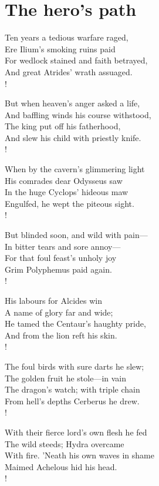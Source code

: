\documentclass[12pt]{book}
\newenvironment{vpoem}[1]%
  {\def\poemvsindentlines{#1}\begin{poem}\small}%
  {\end{poem}\def\poemvsindentlines{\relax}}
\begin{document}
\section{The hero's path}


\begin{vpoem}{23}
    Ten years a tedious warfare raged, \\
      Ere Ilium's smoking ruins paid \\
      For wedlock stained and faith betrayed, \\
    And great Atrides' wrath assuaged. \\!

    But when heaven's anger asked a life, \\
      And baffling winds his course withstood, \\
      The king put off his fatherhood, \\
    And slew his child with priestly knife. \\!

    When by the cavern's glimmering light \\
      His comrades dear Odysseus saw \\
      In the huge Cyclops' hideous maw \\
    Engulfed, he wept the piteous sight. \\!

    But blinded soon, and wild with pain--- \\
      In bitter tears and sore annoy--- \\
      For that foul feast's unholy joy \\
    Grim Polyphemus paid again. \\!

    His labours for Alcides win \\
      A name of glory far and wide; \\
      He tamed the Centaur's haughty pride, \\
    And from the lion reft his skin. \\!

    The foul birds with sure darts he slew; \\
      The golden fruit he stole---in vain \\
      The dragon's watch; with triple chain \\
    From hell's depths Cerberus he drew. \\!

    With their fierce lord's own flesh he fed \\
      The wild steeds; Hydra overcame \\
      With fire. 'Neath his own waves in shame \\
    Maimed Achelous hid his head. \\!


\end{vpoem}
\end{document}
